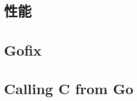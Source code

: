 \section{性能}
\label{sec:profiling}

\section{Gofix}
\label{sec:gofix}

\section{Calling C from Go}
\label{sec:cgo}

